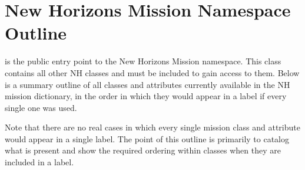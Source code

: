 \documentclass[letterpaper,10pt,english]{sphinxmanual}
\begin{document}
\sphinxstepscope


\chapter{New Horizons Mission Namespace Outline}
\label{\detokenize{detailed/outline:new-horizons-mission-namespace-outline}}\label{\detokenize{detailed/outline::doc}}
\sphinxAtStartPar
{} is the public entry point to the New Horizons Mission
namespace. This class contains all other NH classes and must be included to gain
access to them. Below is a summary outline of all classes and attributes
currently available in the NH mission dictionary, in the order in which they
would appear in a label if every single one was used.

\sphinxAtStartPar
Note that there are no real cases in which every single mission class and
attribute would appear in a single label. The point of this outline is primarily
to catalog what is present and show the required ordering within classes when
they are included in a label.
\end{document}
